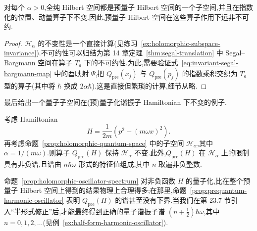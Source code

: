 对每个 $\alpha>0$,全纯 Hilbert 空间都是预量子 Hilbert 空间的一个子空间,并且在指数化的位置、动量算子下不变.因此,预量子 Hilbert 空间在这些算子作用下远非不可约.

\begin{proof}
$\mathcal H_\alpha$ 的不变性是一个直接计算(见练习~\ref{ex:holomorphic-subspace-invariance}).不可约性可以归结为第 14 章定理~\ref{thm:segal-translation} 中 Segal--Bargmann 空间在算子 $T_a$ 下的不可约性.为此,需要验证式~\eqref{eq:invariant-segal-bargmann-map} 中的酉映射 $\Psi$,把 $Q_{\mathrm{pre}}(x_j)$ 与 $Q_{\mathrm{pre}}(p_j)$ 的指数乘积交织为 $T_a$ 型的算子(其中将 $\hbar$ 换成 $2\alpha\hbar$).这是直接但繁琐的计算,细节从略.
\end{proof}

最后给出一个量子子空间在(预)量子化谐振子 Hamiltonian 下不变的例子.

\begin{proposition}[全纯谐振子的谱]
\label{prop:holomorphic-oscillator-spectrum}
考虑 Hamiltonian
\[
 H=\frac{1}{2m}\left(p^2+(m\omega x)^2\right).
\]
再考虑命题~\ref{prop:holomorphic-quantum-space} 中的子空间 $\mathcal H_\alpha$,其中 $\alpha=1/(m\omega)$.则算子 $Q_{\mathrm{pre}}(H)$ 保持 $\mathcal H_\alpha$ 不变.此外,$Q_{\mathrm{pre}}(H)$ 在 $\mathcal H_\alpha$ 上的限制具有非负谱,且谱由 $n\hbar\omega$ 形式的特征值组成,其中 $n$ 取遍非负整数.
\end{proposition}

命题~\ref{prop:holomorphic-oscillator-spectrum} 对非负函数 $H$ 的量子化,比在整个预量子 Hilbert 空间上得到的结果物理上合理得多;在那里,命题~\ref{prop:prequantum-harmonic-oscillator} 表明 $Q_{\mathrm{pre}}(H)$ 的谱甚至没有下界.当我们在第 23.7 节引入“半形式修正”后,才能最终得到正确的量子谐振子谱 $(n+\tfrac12)\hbar\omega$,其中 $n=0,1,2,\ldots$(见例~\ref{ex:half-form-harmonic-oscillator}).

